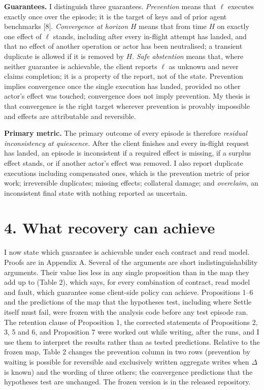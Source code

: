 \documentclass[
  10pt,
]{article}
\begin{document}
\textbf{Guarantees.} I distinguish three guarantees. \emph{Prevention}
means that \(\ell\) executes exactly once over the episode; it is the
target of keys and of prior agent benchmarks {[}8{]}. \emph{Convergence
at horizon \(H\)} means that from time \(H\) on exactly one effect of
\(\ell\) stands, including after every in-flight attempt has landed, and
that no effect of another operation or actor has been neutralised; a
transient duplicate is allowed if it is removed by \(H\). \emph{Safe
abstention} means that, where neither guarantee is achievable, the
client reports \(\ell\) as unknown and never claims completion; it is a
property of the report, not of the state. Prevention implies convergence
once the single execution has landed, provided no other actor's effect
was touched; convergence does not imply prevention. My thesis is that
convergence is the right target wherever prevention is provably
impossible and effects are attributable and reversible.

\textbf{Primary metric.} The primary outcome of every episode is
therefore \emph{residual inconsistency at quiescence}. After the client
finishes and every in-flight request has landed, an episode is
inconsistent if a required effect is missing, if a surplus effect
stands, or if another actor's effect was removed. I also report
duplicate executions including compensated ones, which is the prevention
metric of prior work; irreversible duplicates; missing effects;
collateral damage; and \emph{overclaim}, an inconsistent final state
with nothing reported as uncertain.

\hypertarget{what-recovery-can-achieve}{%
\section*{4. What recovery can
achieve}\label{what-recovery-can-achieve}}

I now state which guarantee is achievable under each contract and read
model. Proofs are in Appendix A. Several of the arguments are short
indistinguishability arguments. Their value lies less in any single
proposition than in the map they add up to (Table 2), which says, for
every combination of contract, read model and fault, which guarantee
some client-side policy can achieve. Propositions 1--6 and the
predictions of the map that the hypotheses test, including where Settle
itself must fail, were frozen with the analysis code before any test
episode ran. The retention clause of Proposition 1, the corrected
statements of Propositions 2, 3, 5 and 6, and Proposition 7 were worked
out while writing, after the runs, and I use them to interpret the
results rather than as tested predictions. Relative to the frozen map,
Table 2 changes the prevention column in two rows (prevention by waiting
is possible for reversible and exclusively written aggregate writes when
\(\Delta\) is known) and the wording of three others; the convergence
predictions that the hypotheses test are unchanged. The frozen version
is in the released repository.
\end{document}
